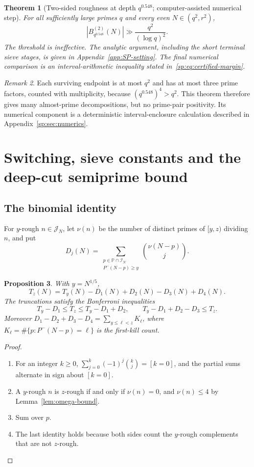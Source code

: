 \documentclass[final,11pt]{elsarticle}
\newtheorem{theorem}{Theorem}[section]
\newtheorem{proposition}[theorem]{Proposition}
\theoremstyle{definition}
\theoremstyle{remark}
\newtheorem{remark}[theorem]{Remark}
\newcommand{\PP}{\mathbb{P}}
\newcommand{\Pm}{P^{-}}
\newcommand{\band}{\mathcal{I}_N}
\newcommand{\cband}{\mathcal{J}_N}
\numberwithin{equation}{section}
\begin{document}
\begin{theorem}[Two-sided roughness at depth $q^{0.548}$;
computer-assisted numerical step]\label{thm:two-sided-0548}
For all sufficiently large primes $q$ and every even $N\in(q^2,r^2)$,
\[
 |B^{(2)}_{q^{0.548}}(N)|\gg \frac{q^2}{(\log q)^2}.
\]
The threshold is ineffective. The analytic argument, including the short terminal sieve stages, is given in Appendix~\ref{app:SP-setting}. The final numerical comparison is an interval-arithmetic inequality stated in~\eqref{sp:eq:certified-margin}.
\end{theorem}

\begin{remark}
Each surviving endpoint is at most $q^2$ and has at most three prime factors, counted with multiplicity, because $(q^{0.548})^4>q^2$. This theorem therefore gives many almost-prime decompositions, but no prime-pair positivity. Its numerical component is a deterministic interval-enclosure calculation described in Appendix~\ref{sp:sec:numerics}.
\end{remark}

\section{Switching, sieve constants and the deep-cut semiprime bound}\label{sec:block4}

\subsection{The binomial identity}
For $y$-rough $n\in\cband$, let $\nu(n)$ be the number of distinct primes of $[y,z)$ dividing $n$, and put
\[
D_j(N)=\sum_{\substack{p\in\PP\cap\band\\ \Pm(N-p)\ge y}}\binom{\nu(N-p)}{j}.
\]

\begin{proposition}\label{prop:binomial}
With $y=N^{1/5}$,
\[
T_z(N)=T_y(N)-D_1(N)+D_2(N)-D_3(N)+D_4(N).
\]
The truncations satisfy the Bonferroni inequalities
\[
T_y-D_1\le T_z\le T_y-D_1+D_2,\qquad T_y-D_1+D_2-D_3\le T_z.
\]
Moreover $D_1-D_2+D_3-D_4=\sum_{y\le\ell<z}K_\ell$, where $K_\ell=\#\{p:\Pm(N-p)=\ell\}$ is the first-kill count.
\end{proposition}

\begin{proof}
\begin{enumerate}
\item For an integer $k\ge0$, $\sum_{j=0}^k(-1)^j\binom kj=[k=0]$, and the partial sums alternate in sign about $[k=0]$.
\item A $y$-rough $n$ is $z$-rough if and only if $\nu(n)=0$, and $\nu(n)\le4$ by Lemma~\ref{lem:omega-bound}.
\item Sum over $p$.
\item The last identity holds because both sides count the $y$-rough complements that are not $z$-rough. \qedhere
\end{enumerate}
\end{proof}
\end{document}
